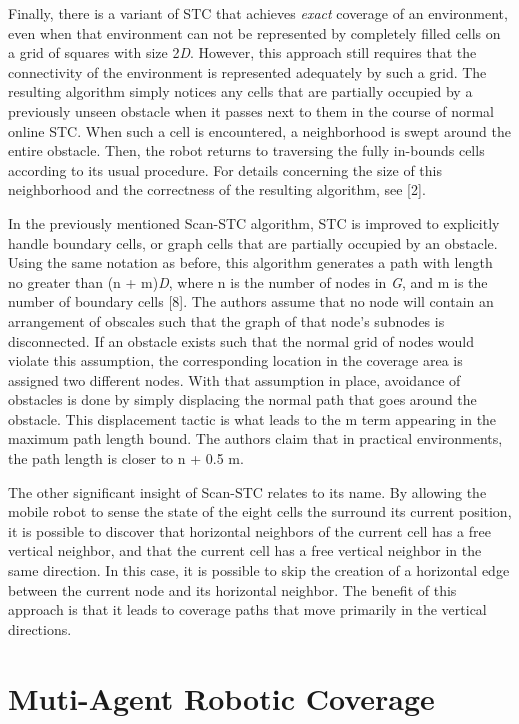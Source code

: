 \documentclass[letterpaper, 12pt, leqno]{report}
\begin{document}
Finally, there is a variant of STC that achieves \textit{exact} coverage of an environment, even when that environment can not be represented by completely filled cells on a grid of squares with size 2\textit{D}. However, this approach still requires that the connectivity of the environment is represented adequately by such a grid. The resulting algorithm simply notices any cells that are partially occupied by a previously unseen obstacle when it passes next to them in the course of normal online STC. When such a cell is encountered, a neighborhood is swept around the entire obstacle. Then, the robot returns to traversing the fully in-bounds cells according to its usual procedure. For details concerning the size of this neighborhood and the correctness of the resulting algorithm, see [2].

In the previously mentioned Scan-STC algorithm, STC is improved to explicitly handle boundary cells, or graph cells that are partially occupied by an obstacle. Using the same notation as before, this algorithm generates a path with length no greater than (n + m)\textit{D}, where n is the number of nodes in \textit{G}, and m is the number of boundary cells [8]. The authors assume that no node will contain an arrangement of obscales such that the graph of that node's subnodes is disconnected. If an obstacle exists such that the normal grid of nodes would violate this assumption, the corresponding location in the coverage area is assigned two different nodes. With that assumption in place, avoidance of obstacles is done by simply displacing the normal path that goes around the obstacle. This displacement tactic is what leads to the m term appearing in the maximum path length bound. The authors claim that in practical environments, the path length is closer to n + 0.5 m.

The other significant insight of Scan-STC relates to its name. By allowing the mobile robot to sense the state of the eight cells the surround its current position, it is possible to discover that horizontal neighbors of the current cell has a free vertical neighbor, and that the current cell has a free vertical neighbor in the same direction. In this case, it is possible to skip the creation of a horizontal edge between the current node and its horizontal neighbor. The benefit of this approach is that it leads to coverage paths that move primarily in the vertical directions. 

\section{Muti-Agent Robotic Coverage}
\end{document}
